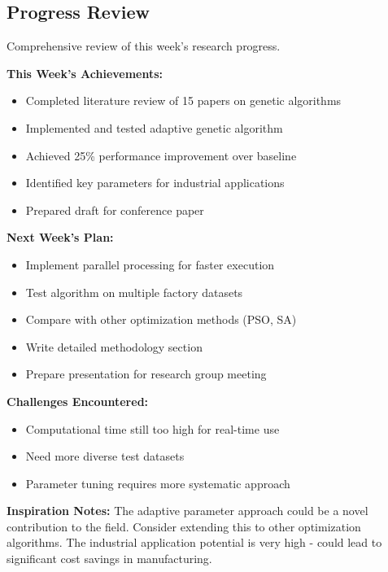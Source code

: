 \documentclass[12pt,a4paper,twoside]{article}
\begin{document}
\subsection{Progress Review}
Comprehensive review of this week's research progress.

\begin{summary}
\textbf{This Week's Achievements:}
\begin{itemize}
    \item Completed literature review of 15 papers on genetic algorithms
    \item Implemented and tested adaptive genetic algorithm
    \item Achieved 25\% performance improvement over baseline
    \item Identified key parameters for industrial applications
    \item Prepared draft for conference paper
\end{itemize}

\textbf{Next Week's Plan:}
\begin{itemize}
    \item Implement parallel processing for faster execution
    \item Test algorithm on multiple factory datasets
    \item Compare with other optimization methods (PSO, SA)
    \item Write detailed methodology section
    \item Prepare presentation for research group meeting
\end{itemize}

\textbf{Challenges Encountered:}
\begin{itemize}
    \item Computational time still too high for real-time use
    \item Need more diverse test datasets
    \item Parameter tuning requires more systematic approach
\end{itemize}

\textbf{Inspiration Notes:}
The adaptive parameter approach could be a novel contribution to the field. Consider extending this to other optimization algorithms. The industrial application potential is very high - could lead to significant cost savings in manufacturing.
\end{summary}

\end{document}
